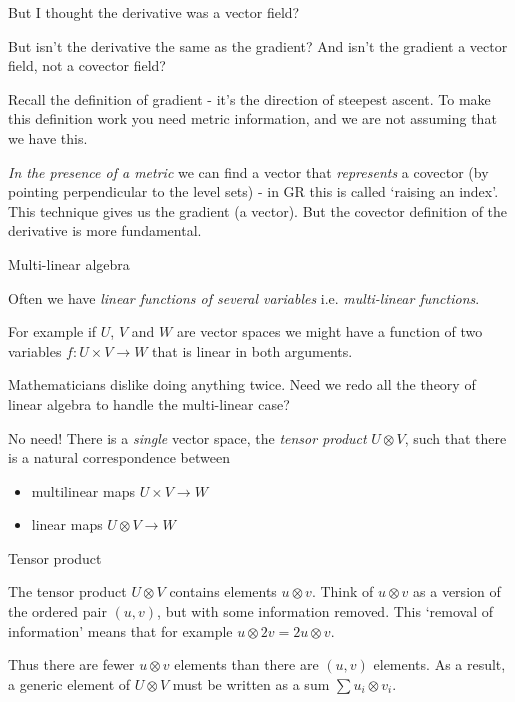 \documentclass{beamer}
\begin{document}
\begin{frame}{But I thought the derivative was a vector field?}

But isn't the derivative the same as the gradient? And isn't the gradient a vector field, not a covector field?

Recall the definition of gradient - it's the direction of steepest ascent. To make this definition work you need metric information, and we are not assuming that we have this.

\textit{In the presence of a metric} we can find a vector that \textit{represents} a covector (by pointing perpendicular to the level sets) - in GR this is called `raising an index'. This technique gives us the gradient (a vector). But the covector definition of the derivative is more fundamental.

\end{frame}

\begin{frame}{Multi-linear algebra}

Often we have \textit{linear functions of several variables} i.e. \textit{multi-linear functions}.

For example if $U$, $V$ and $W$ are vector spaces we might have a function of two variables $f \colon U \times V \to W$ that is linear in both arguments.

Mathematicians dislike doing anything twice. Need we redo all the theory of linear algebra to handle the multi-linear case?

No need! There is a \textit{single} vector space, the \textit{tensor product} $U \otimes V$, such that there is a natural correspondence between
\begin{itemize}
\item{multilinear maps $U \times V \to W$}
\item{linear maps $U \otimes V \to W$}
\end{itemize}

\end{frame}

\begin{frame}{Tensor product}

The tensor product $U \otimes V$ contains elements $u \otimes v$. Think of $u \otimes v$ as a version of the ordered pair $(u, v)$, but with some information removed. This `removal of information' means that for example $u \otimes 2v = 2u \otimes v$.

Thus there are fewer $u \otimes v$ elements than there are $(u, v)$ elements. As a result, a generic element of $U \otimes V$ must be written as a sum $\sum u_i \otimes v_i$.

\end{frame}
\end{document}
